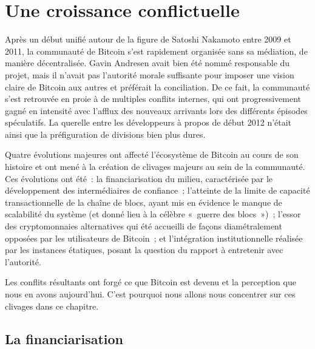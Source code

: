 
\chapter{Une croissance conflictuelle}
\label{ch:clivages}

Après un début unifié autour de la figure de Satoshi Nakamoto entre 2009 et 2011, la communauté de Bitcoin s'est rapidement organisée sans sa médiation, de manière décentralisée. Gavin Andresen avait bien été nommé responsable du projet, mais il n'avait pas l'autorité morale suffisante pour imposer une vision claire de Bitcoin aux autres et préférait la conciliation. De ce fait, la communauté s'est retrouvée en proie à de multiples conflits internes, qui ont progressivement gagné en intensité avec l'afflux des nouveaux arrivants lors des différents épisodes spéculatifs. La querelle entre les développeurs à propos de  début 2012 n'était ainsi que la préfiguration de divisions bien plus dures.

Quatre évolutions majeures ont affecté l'écosystème de Bitcoin au cours de son histoire et ont mené à la création de clivages majeurs au sein de la communauté. Ces évolutions ont été~: la financiarisation du milieu, caractérisée par le développement des intermédiaires de confiance~; l'atteinte de la limite de capacité transactionnelle de la chaîne de blocs, ayant mis en évidence le manque de scalabilité du système (et donné lieu à la célèbre «~guerre des blocs~»)~; l'essor des cryptomonnaies alternatives qui été accueilli de façons diamétralement opposées par les utilisateurs de Bitcoin~; et l'intégration institutionnelle réalisée par les instances étatiques, posant la question du rapport à entretenir avec l'autorité.

Les conflits résultants ont forgé ce que Bitcoin est devenu et la perception que nous en avons aujourd'hui. C'est pourquoi nous allons nous concentrer sur ces clivages dans ce chapitre.


\section*{La financiarisation} %

